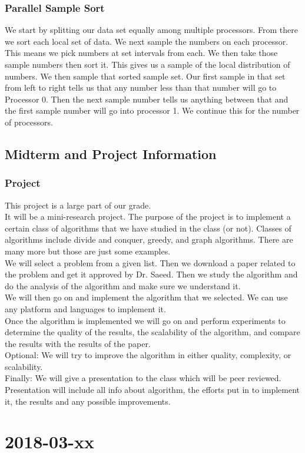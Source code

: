 \documentclass{report}
\newcommand{\mychapter}[2]{
	\setcounter{chapter}{#1}
	\setcounter{section}{0}
	\chapter*{#2}
	\addcontentsline{toc}{chapter}{#2}
}
\begin{document}
\subsection{Parallel Sample Sort}
We start by splitting our data set equally among multiple processors. From there we sort each local set of data. We next sample the numbers on each processor. This means we pick numbers at set intervals from each. We then take those sample numbers then sort it. This gives us a sample of the local distribution of numbers. We then sample that sorted sample set. Our first sample in that set from left to right tells us that any number less than that number will go to Processor 0. Then the next sample number tells us anything between that and the first sample number will go into processor 1. We continue this for the number of processors.

\section{Midterm and Project Information}
\subsection{Project}
This project is a large part of our grade.\\
It will be a mini-research project. The purpose of the project is to implement a certain class of algorithms that we have studied in the class (or not). Classes of algorithms include divide and conquer, greedy, and graph algorithms. There are many more but those are just some examples.\\
We will select a problem from a given list. Then we download a paper related to the problem and get it approved by Dr. Saeed. Then we study the algorithm and do the analysis of the algorithm and make sure we understand it.\\
We will then go on and implement the algorithm that we selected. We can use any platform and languages to implement it.\\
Once the algorithm is implemented we will go on and perform experiments to determine the quality of the results, the scalability of the algorithm, and compare the results with the results of the paper.\\
Optional: We will try to improve the algorithm in either quality, complexity, or scalability.\\
Finally: We will give a presentation to the class which will be peer reviewed.\\
Presentation will include all info about algorithm, the efforts put in to implement it, the results and any possible improvements.



\mychapter{8}{2018-03-xx}
\end{document}
